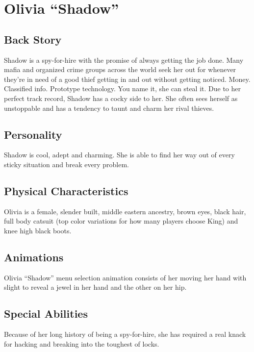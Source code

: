 \documentclass[14pt]{report}
\begin{document}

\section{Olivia ``Shadow''}


\subsection{Back Story}

Shadow is a spy-for-hire with the promise of always getting the job done. Many mafia and organized crime groups across the world seek her out for whenever they’re in need of a good thief getting in and out without getting noticed. Money. Classified info. Prototype technology. You name it, she can steal it. Due to her perfect track record, Shadow has a cocky side to her. She often sees herself as unstoppable and has a tendency to taunt and charm her rival thieves.

\subsection{Personality}

Shadow is cool, adept and charming. She is able to find her way out of every sticky situation and break every problem.

\subsection{Physical Characteristics}

Olivia is a female, slender built, middle eastern ancestry, brown eyes, black hair, full body catsuit (top color variations for how many players choose King) and knee high black boots.

\subsection{Animations}

Olivia “Shadow” menu selection animation consists of her moving her hand with slight to reveal a jewel in her hand and the other on her hip.

\subsection{Special Abilities}

Because of her long history of being a spy-for-hire, she has required a real knack for hacking and breaking into the toughest of locks.
\end{document}
